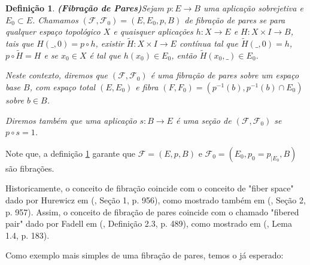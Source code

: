 \documentclass[12pt,oneside]{book} %
\newtheorem{defi}   {\hspace{0.5cm}Defini\c c\~ao}[chapter]
\newcommand{\wt}{\widetilde}
\begin{document}
\begin{defi}{\bf (Fibração de Pares)}\label{defi_par-fib}
	Sejam $p:E\to B$ uma aplicação sobrejetiva e $E_{0}\subset E$. Chamamos $(\mathcal{F},\mathcal{F}_{0})=(E,E_{0},p,B)$ de fibração de pares se para qualquer espaço topológico $X$ e quaisquer aplicações $h:X\to E$ e $H:X\times I\to B$, tais que $H(\_,0)=p\circ h$, existir $\wt{H}:X\times I\to E$ contínua tal que $\wt{H}(\_,0)=h$, $p\circ\wt{H}=H$ e se $x_{0}\in X$ é tal que $h(x_{0})\in E_{0}$, então $\wt{H}(x_{0},\_)\in E_{0}$.
	
	\par Neste contexto, diremos que $(\mathcal{F},\mathcal{F}_{0})$ é uma fibração de pares sobre um espaço base $B$, com espaço total $(E,E_{0})$ e fibra $(F,F_{0})=(p^{-1}(b),p^{-1}(b)\cap E_{0})$ sobre $b\in B$.
	
	\par Diremos também que uma aplicação $s:B\to E$ é uma seção de $(\mathcal{F},\mathcal{F}_{0})$ se $p\circ s=1$.
\end{defi}

\par Note que, a definição \ref{defi_par-fib} garante que $\mathcal{F}=(E,p,B)$ e $\mathcal{F}_{0}=(E_{0},p_{0}=p_{|E_{0}},B)$ são fibrações.

\par Historicamente, o conceito de fibração coincide com o conceito de "fiber space" dado por Hurewicz em (\cite{hurewicz}, Seção 1, p. 956), como mostrado também em (\cite{hurewicz}, Seção 2, p. 957). Assim, o conceito de fibração de pares coincide com o chamado "fibered pair" dado por Fadell em (\cite{fadell_1}, Definição 2.3, p. 489), como mostrado em (\cite{brown}, Lema 1.4, p. 183).

\par Como exemplo mais simples de uma fibração de pares, temos o já esperado:
\end{document}
